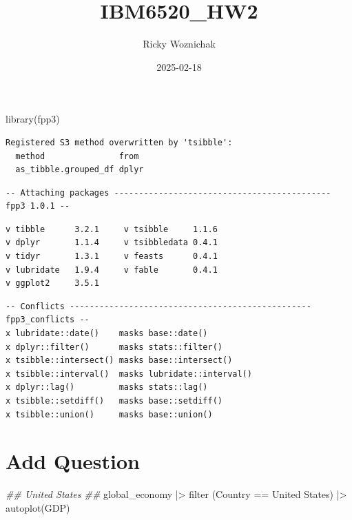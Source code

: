 \documentclass[
  letterpaper,
  DIV=11,
  numbers=noendperiod]{scrartcl}
\title{IBM6520\_HW2}
\author{Ricky Woznichak}
\date{2025-02-18}
\newenvironment{Shaded}{\begin{snugshade}}{\end{snugshade}}
\newcommand{\DocumentationTok}[1]{\textcolor[rgb]{0.37,0.37,0.37}{\textit{#1}}}
\newcommand{\FunctionTok}[1]{\textcolor[rgb]{0.28,0.35,0.67}{#1}}
\newcommand{\NormalTok}[1]{\textcolor[rgb]{0.00,0.23,0.31}{#1}}
\newcommand{\SpecialCharTok}[1]{\textcolor[rgb]{0.37,0.37,0.37}{#1}}
\newcommand{\StringTok}[1]{\textcolor[rgb]{0.13,0.47,0.30}{#1}}
\begin{document}
\maketitle


\begin{Shaded}
\begin{Highlighting}[]
\FunctionTok{library}\NormalTok{(fpp3)}
\end{Highlighting}
\end{Shaded}

\begin{verbatim}
Registered S3 method overwritten by 'tsibble':
  method               from 
  as_tibble.grouped_df dplyr
\end{verbatim}

\begin{verbatim}
-- Attaching packages -------------------------------------------- fpp3 1.0.1 --
\end{verbatim}

\begin{verbatim}
v tibble      3.2.1     v tsibble     1.1.6
v dplyr       1.1.4     v tsibbledata 0.4.1
v tidyr       1.3.1     v feasts      0.4.1
v lubridate   1.9.4     v fable       0.4.1
v ggplot2     3.5.1     
\end{verbatim}

\begin{verbatim}
-- Conflicts ------------------------------------------------- fpp3_conflicts --
x lubridate::date()    masks base::date()
x dplyr::filter()      masks stats::filter()
x tsibble::intersect() masks base::intersect()
x tsibble::interval()  masks lubridate::interval()
x dplyr::lag()         masks stats::lag()
x tsibble::setdiff()   masks base::setdiff()
x tsibble::union()     masks base::union()
\end{verbatim}

\section{Add Question}\label{add-question}

\begin{Shaded}
\begin{Highlighting}[]
\DocumentationTok{\#\# United States \#\#}
\NormalTok{global\_economy }\SpecialCharTok{|\textgreater{}}
\FunctionTok{filter}\NormalTok{ (Country }\SpecialCharTok{==} \StringTok{\textquotesingle{}United States\textquotesingle{}}\NormalTok{) }\SpecialCharTok{|\textgreater{}}
\FunctionTok{autoplot}\NormalTok{(GDP)}
\end{Highlighting}
\end{Shaded}
\end{document}
